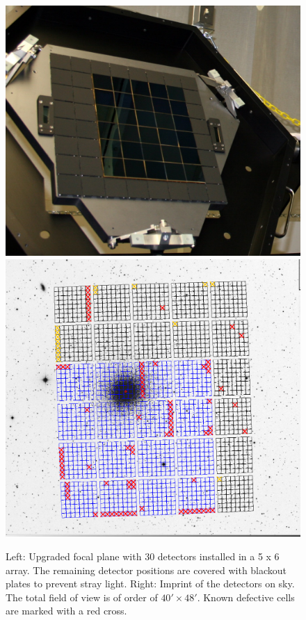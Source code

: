 \documentclass[]{spieman}
\begin{document}
\begin{figure}
	\centering
	\hfill
	\includegraphics[height=0.4\textwidth]{images/detectorsOnFocalPlane5x6.jpg}
	\hfill
	\includegraphics[height=0.4\textwidth]{images/5ODI_Imprint.png}
	\hfill \\[1ex]
	
	\caption{\label{fig_focalplane} Left: Upgraded focal plane with 30 
	detectors installed in a 5 x 6 array. The remaining detector positions are 
	covered with blackout plates to prevent stray light. Right: Imprint of the 
	detectors on sky. The total field of view is of order of $40'\times 48'$. 
	Known defective cells are marked with a red cross. }
\end{figure}
\end{document}
